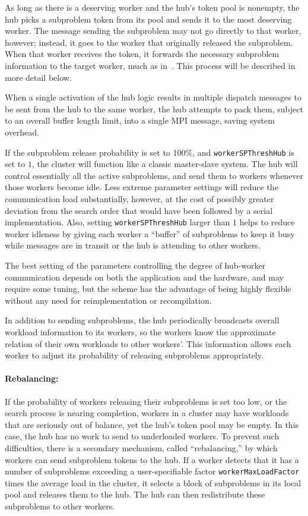 As long as there is a deserving worker and the hub's token pool is
nonempty, the hub picks a subproblem token from its pool and sends it
to the most deserving worker.  The message sending the subproblem may
not go directly to that worker, however; instead, it goes to the
worker that originally released the subproblem.  When that worker
receives the token, it forwards the necessary subproblem information
to the target worker, much as in~\cite{Eck94,Eck97,RRM93}.
This process will be described in more detail below.

When a single activation of the hub logic results in multiple
dispatch messages to be sent from the hub to the same worker, the hub
attempts to pack them, subject to an overall buffer length limit, into
a single MPI message, saving system overhead.

If the subproblem release probability is set to 100\%, and
\texttt{workerSPThreshHub} is set to $1$, the cluster will function
like a classic master-slave system.  The hub will control essentially
all the active subproblems, and send them to workers whenever those
workers become idle.  Less extreme parameter settings will reduce the
communication load substantially, however, at the cost of possibly
greater deviation from the search order that would have been followed
by a serial implementation.  Also, setting \texttt{workerSPThreshHub}
larger than $1$ helps to reduce worker idleness by giving each worker
a ``buffer'' of subproblems to keep it busy while messages are in
transit or the hub is attending to other workers.

The best setting of the parameters controlling the degree of
hub-worker communication depends on both the application and the
hardware, and may require some tuning, but the scheme has the advantage of
being highly flexible without any need for reimplementation or recompilation.

In addition to sending subproblems, the hub periodically broadcasts
overall workload information to its workers, so the workers know the
approximate relation of their own workloads to other workers'.  This
information allows each worker to adjust its probability of releasing
subproblems appropriately.

\paragraph{Rebalancing:}
If the probability of workers releasing their subproblems is set too
low, or the search process is nearing completion, 
workers in a cluster may have workloads that are
seriously out of balance, yet the hub's token pool may be empty.  In this
case, the hub has no work to send to underloaded workers.  To prevent
such difficulties, there is a secondary mechanism, called
``rebalancing,'' by which workers can send subproblem tokens to the
hub.  If a worker detects that it has a number of subproblems
exceeding a user-specifiable factor \texttt{workerMaxLoadFactor} times
the average load in the cluster, it selects a block of subproblems in
its local pool and releases them to the hub.  The hub can then
redistribute these subproblems to other workers.  

